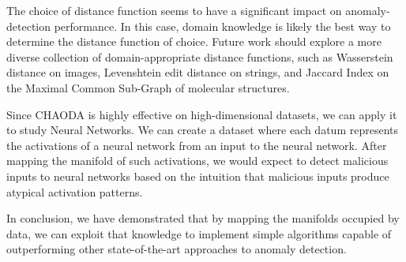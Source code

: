 
The choice of distance function seems to have a significant impact on anomaly-detection performance.
In this case, domain knowledge is likely the best way to determine the distance function of choice.
Future work should explore a more diverse collection of domain-appropriate distance functions, such as Wasserstein distance on images, Levenshtein edit distance on strings, and Jaccard Index on the Maximal Common Sub-Graph of molecular structures.

Since CHAODA is highly effective on high-dimensional datasets, we can apply it to study Neural Networks.
We can create a dataset where each datum represents the activations of a neural network from an input to the neural network.
After mapping the manifold of such activations, we would expect to detect malicious inputs to neural networks based on the intuition that malicious inputs produce atypical activation patterns.


In conclusion, we have demonstrated that by mapping the manifolds occupied by data, we can exploit that knowledge to implement simple algorithms capable of outperforming other state-of-the-art approaches to anomaly detection.
